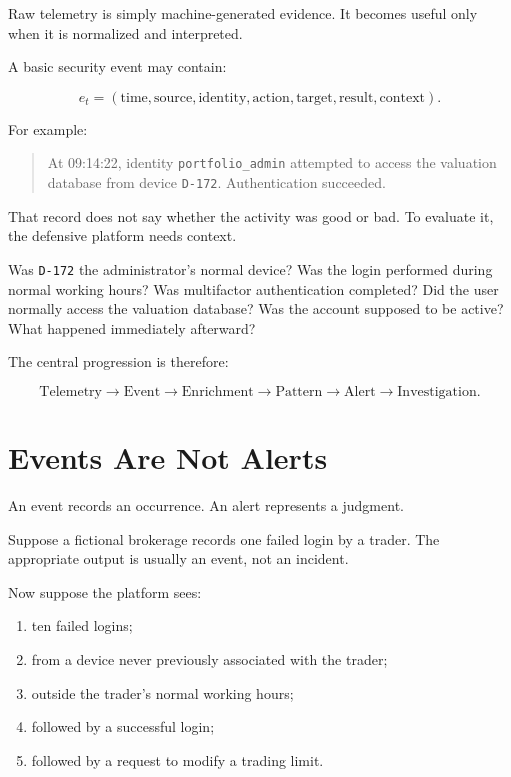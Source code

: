 Raw telemetry is simply machine-generated evidence. It becomes useful only when it is normalized and interpreted.

A basic security event may contain:

\begin{equation}
e_t =
(\text{time},
\text{source},
\text{identity},
\text{action},
\text{target},
\text{result},
\text{context}).
\end{equation}

For example:

\begin{quote}
At 09:14:22, identity \texttt{portfolio\_admin} attempted to access the valuation database from device \texttt{D-172}. Authentication succeeded.
\end{quote}

That record does not say whether the activity was good or bad. To evaluate it, the defensive platform needs context.

Was \texttt{D-172} the administrator's normal device? Was the login performed during normal working hours? Was multifactor authentication completed? Did the user normally access the valuation database? Was the account supposed to be active? What happened immediately afterward?

The central progression is therefore:

\begin{equation}
\text{Telemetry}
\rightarrow
\text{Event}
\rightarrow
\text{Enrichment}
\rightarrow
\text{Pattern}
\rightarrow
\text{Alert}
\rightarrow
\text{Investigation}.
\end{equation}

\section{Events Are Not Alerts}

An event records an occurrence. An alert represents a judgment.

Suppose a fictional brokerage records one failed login by a trader. The appropriate output is usually an event, not an incident.

Now suppose the platform sees:

\begin{enumerate}
    \item ten failed logins;
    \item from a device never previously associated with the trader;
    \item outside the trader's normal working hours;
    \item followed by a successful login;
    \item followed by a request to modify a trading limit.
\end{enumerate}

